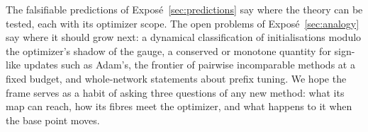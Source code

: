 The falsifiable predictions of Exposé~\ref{sec:predictions} say where the theory can be tested, each with its optimizer scope. The open problems of Exposé~\ref{sec:analogy} say where it should grow next: a dynamical classification of initialisations modulo the optimizer's shadow of the gauge, a conserved or monotone quantity for sign-like updates such as Adam's, the frontier of pairwise incomparable methods at a fixed budget, and whole-network statements about prefix tuning. We hope the frame serves as a habit of asking three questions of any new method: what its map can reach, how its fibres meet the optimizer, and what happens to it when the base point moves.
